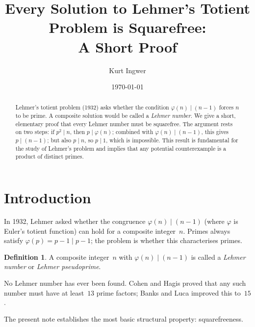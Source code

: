 \documentclass[12pt,a4paper]{amsart}
\theoremstyle{definition}
\newtheorem{definition}[theorem]{Definition}
\newcommand{\euler}{\varphi}
\begin{document}

\title{Every Solution to Lehmer's Totient Problem is Squarefree:\\ A Short Proof}

\author{Kurt Ingwer}
\address{Specialist Mathematics Project, Version Build 44}
\date{\today}

\begin{abstract}
Lehmer's totient problem (1932) asks whether the condition $\euler(n) \mid (n-1)$
forces $n$ to be prime.  A composite solution would be called a \emph{Lehmer number}.
We give a short, elementary proof that every Lehmer number must be squarefree.
The argument rests on two steps: if $p^2 \mid n$, then $p \mid \euler(n)$;
combined with $\euler(n) \mid (n-1)$, this gives $p \mid (n-1)$; but also $p \mid n$,
so $p \mid 1$, which is impossible.  This result is fundamental for the study of
Lehmer's problem and implies that any potential counterexample is a product of distinct primes.
\end{abstract}

\maketitle

\section{Introduction}

In 1932, Lehmer \cite{Lehmer1932} asked whether the congruence
$\euler(n) \mid (n-1)$ (where $\euler$ is Euler's totient function) can hold
for a composite integer~$n$.  Primes always satisfy $\euler(p) = p-1 \mid p-1$;
the problem is whether this characterises primes.

\begin{definition}
A composite integer~$n$ with $\euler(n) \mid (n-1)$ is called a
\emph{Lehmer number} or \emph{Lehmer pseudoprime}.
\end{definition}

No Lehmer number has ever been found.  Cohen and Hagis \cite{Cohen1980} proved that
any such number must have at least~$13$ prime factors; Banks and Luca \cite{Banks2009}
improved this to~$15$.

The present note establishes the most basic structural property:
squarefreeness.
\end{document}
